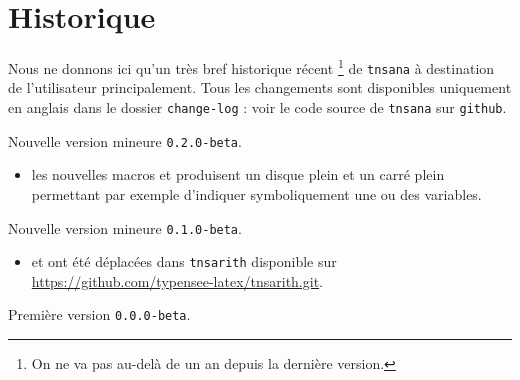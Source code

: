 \documentclass[12pt,a4paper]{article}
\begin{document}
\newpage

\section{Historique}

Nous ne donnons ici qu'un très bref historique récent
\footnote{
	On ne va pas au-delà de un an depuis la dernière version.
}
de \verb+tnsana+ à destination de l'utilisateur principalement.
Tous les changements sont disponibles uniquement en anglais dans le dossier \verb+change-log+ : voir le code source de \verb+tnsana+ sur \verb+github+.

\begin{description}

    \medskip
    \item[2020-07-15] Nouvelle version mineure \verb+0.2.0-beta+.
    
    \begin{itemize}[itemsep=.5em]
        \item {} les nouvelles macros  et  produisent un disque plein et un carré plein permettant par exemple d'indiquer symboliquement une ou des variables.
        
        \separation
    \end{itemize}

    \medskip
    \item[2020-07-12] Nouvelle version mineure \verb+0.1.0-beta+. 
        
    \begin{itemize}[itemsep=.5em]
        \item {}  et  ont été déplacées dans \texttt{tnsarith} disponible sur \url{https://github.com/typensee-latex/tnsarith.git}.
    \end{itemize}
    
    
    \separation

    \medskip
    \item[2020-07-10] Première version \verb+0.0.0-beta+.


\end{description}
\end{document}
